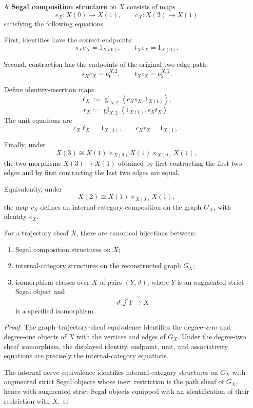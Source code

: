 \begin{definition}
\label{def:segal-composition-structure}
A \textbf{Segal composition structure} on \(X\) consists of maps
\[
    e_X:X(0)\to X(1),
    \qquad
    c_X:X(2)\to X(1)
\]
satisfying the following equations.

First, identities have the correct endpoints:
\[
    s_Xe_X=1_{X(0)},
    \qquad
    t_Xe_X=1_{X(0)}.
\]

Second, contraction has the endpoints of the original two-edge path:
\[
    s_Xc_X=\nu_0^{X,2},
    \qquad
    t_Xc_X=\nu_2^{X,2}.
\]

Define identity-insertion maps
\[
    \ell_X
    :=
    \operatorname{gl}_{X,2}
    \left\langle
        e_Xs_X,
        1_{X(1)}
    \right\rangle,
\]
\[
    r_X
    :=
    \operatorname{gl}_{X,2}
    \left\langle
        1_{X(1)},
        e_Xt_X
    \right\rangle.
\]
The unit equations are
\[
    c_X\ell_X=1_{X(1)},
    \qquad
    c_Xr_X=1_{X(1)}.
\]

Finally, under
\[
    X(3)
    \cong
    X(1)\times_{X(0)}X(1)\times_{X(0)}X(1),
\]
the two morphisms \(X(3)\to X(1)\) obtained by first contracting the
first two edges and by first contracting the last two edges are equal.
\end{definition}

Equivalently, under
\[
    X(2)
    \cong
    X(1)\times_{X(0)}X(1),
\]
the map \(c_X\) defines an internal-category composition on the graph
\(G_X\), with identity \(e_X\).

\begin{theorem}
\label{thm:classification-segal-composition-structures}
For a trajectory sheaf \(X\), there are canonical bijections between:
\begin{enumerate}
    \item Segal composition structures on \(X\);
    \item internal-category structures on the reconstructed graph \(G_X\);
    \item isomorphism classes over \(X\) of pairs \((Y,\vartheta)\), where
    \(Y\) is an augmented strict Segal object and
    \[
        \vartheta:j^\ast Y\xrightarrow{\cong}X
    \]
    is a specified isomorphism.
\end{enumerate}
\end{theorem}

\begin{proof}
The graph--trajectory-sheaf equivalence identifies the degree-zero and
degree-one objects of \(X\) with the vertices and edges of \(G_X\). Under
the degree-two sheaf isomorphism, the displayed identity, endpoint, unit, and
associativity equations are precisely the internal-category equations.

The internal nerve equivalence identifies internal-category structures on
\(G_X\) with augmented strict Segal objects whose inert restriction is the
path sheaf of \(G_X\), hence with augmented strict Segal objects equipped
with an identification of their restriction with \(X\).
\end{proof}

